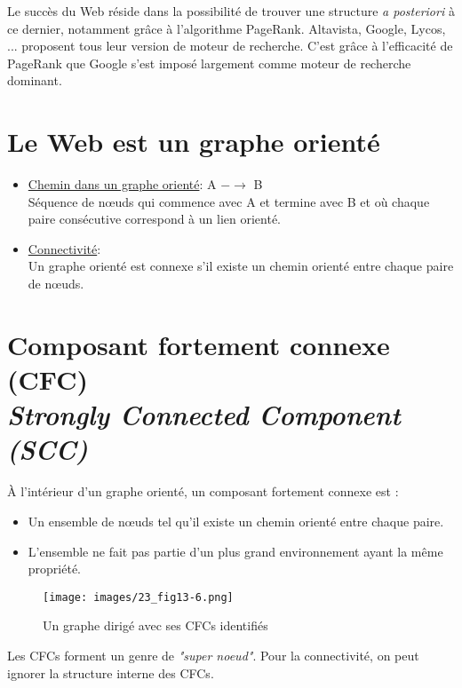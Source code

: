 Le succès du Web réside dans la possibilité de trouver une structure \textit{a posteriori} à ce dernier, notamment grâce à l'algorithme PageRank. Altavista, Google, Lycos, ... proposent tous leur version de moteur de recherche. C'est grâce à l'efficacité de PageRank que Google s'est imposé largement comme moteur de recherche dominant.

\section{Le Web est un graphe orienté}
\begin{itemize}
\item \underline{Chemin dans un graphe orienté}: A $- \rightarrow$ B
\vspace{0.1cm}
\\Séquence de nœuds qui commence avec A et termine avec B et où chaque paire consécutive correspond à un lien orienté.

\item \underline{Connectivité}: 
\vspace{0.1cm}
\\Un graphe orienté est connexe s'il existe un chemin orienté entre chaque paire de nœuds.
\end{itemize}

\section{Composant fortement connexe (CFC) \\ \textit{Strongly Connected Component (SCC)} }

À l'intérieur d'un graphe orienté, un composant fortement connexe est :
\begin{itemize}
    \item Un ensemble de nœuds tel qu'il existe un chemin orienté entre chaque paire.
    \item L'ensemble ne fait pas partie d'un plus grand environnement ayant la même propriété. 
\end{itemize}

\begin{figure}[!ht]
\centering
\texttt{[image: images/23\_fig13-6.png]}
\caption{Un graphe dirigé avec ses CFCs identifiés}
\label{cfc_exemple}
\end{figure}

Les CFCs forment un genre de \textit{"super noeud"}. Pour la connectivité, on peut ignorer la structure interne des CFCs.

